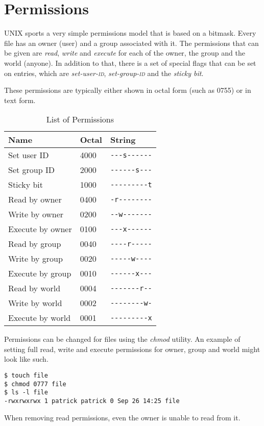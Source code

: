 \documentclass[a4paper]{article}
\begin{document}
\section{Permissions}

UNIX sports a very simple permissions model that is based on a bitmask. Every file has an owner (user) and a group associated with it. The permissions that can be given are \emph{read}, \emph{write} and \emph{execute} for each of the owner, the group and the world (anyone). In addition to that, there is a set of special flags that can be set on entries, which are \emph{set-user-\textsc{id}}, \emph{set-group-\textsc{id}} and the \emph{sticky bit}.

These permissions are typically either shown in octal form (such as 0755) or in text form.

\begin{table}[!h]
\centering\caption{List of Permissions}
\begin{tabular}{@{}lll@{}}
\toprule
\textbf{Name} & \textbf{Octal} & \textbf{String}\\
\midrule
Set user ID      & 4000 & \verb|---s------|\\
Set group ID     & 2000 & \verb|------s---|\\
Sticky bit       & 1000 & \verb|---------t|\\
Read by owner    & 0400 & \verb|-r--------|\\
Write by owner   & 0200 & \verb|--w-------|\\
Execute by owner & 0100 & \verb|---x------|\\
Read by group    & 0040 & \verb|----r-----|\\
Write by group   & 0020 & \verb|-----w----|\\
Execute by group & 0010 & \verb|------x---|\\
Read by world    & 0004 & \verb|-------r--|\\
Write by world   & 0002 & \verb|--------w-|\\
Execute by world & 0001 & \verb|---------x|\\
\bottomrule  
\end{tabular}
\end{table}
Permissions can be changed for files using the \emph{chmod} utility. An example of setting full read, write and execute permissions for owner, group and world might look like such.

\begin{verbatim}
$ touch file
$ chmod 0777 file
$ ls -l file
-rwxrwxrwx 1 patrick patrick 0 Sep 26 14:25 file  
\end{verbatim}
When removing read permissions, even the owner is unable to read from it.
\end{document}
